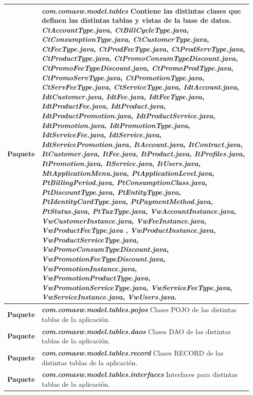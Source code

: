 \begin{longtable}{m{3cm} m{12cm}}
	\textbf{Paquete} & \textit{\textbf{com.comasw.model.tables}} \newline
	Contiene las distintas clases que definen las distintas tablas y vistas de la base de datos.\newline
\textit{CtAccountType.java}, 
\textit{CtBillCycleType.java}, 
\textit{CtConsumptionType.java}, 
\textit{CtCustomerType.java}, 
\textit{CtFeeType.java}, 
\textit{CtProdFeeType.java}, 
\textit{CtProdServType.java}, 
\textit{CtProductType.java}, 
\textit{CtPromoConsumTypeDiscount.java}, 
\textit{CtPromoFeeTypeDiscount.java}, 
\textit{CtPromoProdType.java}, 
\textit{CtPromoServType.java}, 
\textit{CtPromotionType.java}, 
\textit{CtServFeeType.java}, 
\textit{CtServiceType.java}, 
\textit{IdtAccount.java}, 
\textit{IdtCustomer.java}, 
\textit{IdtFee.java}, 
\textit{IdtFeeType.java}, 
\textit{IdtProductFee.java}, 
\textit{IdtProduct.java}, 
\textit{IdtProductPromotion.java}, 
\textit{IdtProductService.java}, 
\textit{IdtPromotion.java}, 
\textit{IdtPromotionType.java}, 
\textit{IdtServiceFee.java}, 
\textit{IdtService.java}, 
\textit{IdtServicePromotion.java}, 
\textit{ItAccount.java}, 
\textit{ItContract.java}, 
\textit{ItCustomer.java}, 
\textit{ItFee.java}, 
\textit{ItProduct.java}, 
\textit{ItProfiles.java}, 
\textit{ItPromotion.java}, 
\textit{ItService.java}, 
\textit{ItUsers.java}, 
\textit{MtApplicationMenu.java}, 
\textit{PtApplicationLevel.java}, 
\textit{PtBillingPeriod.java}, 
\textit{PtConsumptionClass.java}, 
\textit{PtDiscountType.java}, 
\textit{PtEntityType.java}, 
\textit{PtIdentityCardType.java}, 
\textit{PtPaymentMethod.java}, 
\textit{PtStatus.java}, 
\textit{PtTaxType.java}, 
\textit{VwAccountInstance.java}, 
\textit{VwCustomerInstance.java}, 
\textit{VwFeeInstance.java}, 
\textit{VwProductFeeType.java} ,
\textit{VwProductInstance.java}, 
\textit{VwProductServiceType.java}, 
\textit{VwPromoConsumTypeDiscount.java}, 
\textit{VwPromotionFeeTypeDiscount.java}, 
\textit{VwPromotionInstance.java}, 
\textit{VwPromotionProductType.java}, 
\textit{VwPromotionServiceType.java}, 
\textit{VwServiceFeeType.java}, 
\textit{VwServiceInstance.java}, 
\textit{VwUsers.java}.
 \\\hline
	\textbf{Paquete} & \textit{\textbf{com.comasw.model.tables.pojos}}\newline
	Clases POJO de las distintas tablas de la aplicación.
\\\hline
	\textbf{Paquete} & \textit{\textbf{com.comasw.model.tables.daos}}\newline
	Clases DAO de las distintas tablas de la aplicación.
\\\hline
	\textbf{Paquete} & \textit{\textbf{com.comasw.model.tables.record}}\newline
	Clases RECORD de las distintas tablas de la aplicación.
\\\hline
	\textbf{Paquete} & \textit{\textbf{com.comasw.model.tables.interfaces}}\newline
	Interfaces para distintas tablas de la aplicación.
\\\hline

\end{longtable}    